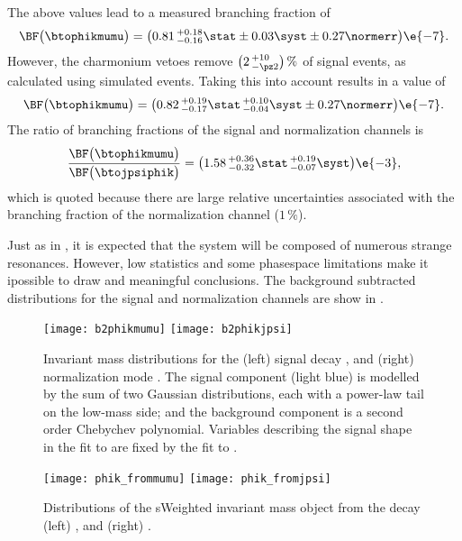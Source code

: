 The above values lead to a measured branching fraction of
\begin{equation}
  \BF\big(\btophikmumu\big)=
  \big(0.81\,^{+0.18}_{-0.16}\stat\pm0.03\syst\pm0.27\normerr\big)\e{-7}.
\end{equation}
However, the charmonium vetoes remove $\big(2\,^{+10}_{-\pz2}\big)\,\%$ of signal events, as
calculated using simulated events.
Taking this into account results in a value of
\begin{equation}
  \BF\big(\btophikmumu\big)=
  \big(0.82\,^{+0.19}_{-0.17}\stat\,^{+0.10}_{-0.04}\syst\pm0.27\normerr\big)\e{-7}.
\end{equation}
The ratio of branching fractions of the signal and normalization channels is
\begin{equation}
  \frac{ \BF\big(\btophikmumu\big) }{ \BF\big(\btojpsiphik\big) }
  =\big(1.58\,^{+0.36}_{-0.32}\stat\,^{+0.19}_{-0.07}\syst\big)\e{-3},
\end{equation}
which is quoted because there are large relative uncertainties associated with the branching
fraction of the normalization channel (\approx$1\,\%$).

Just as in \kpipi, it is expected that the \phik system will be composed of numerous strange
resonances.
However, low statistics and some phasespace limitations make it ipossible to draw and meaningful
conclusions.
The background subtracted \phik distributions for the signal and normalization channels are show in
.


\begin{figure}
  \begin{center}
    \texttt{[image: b2phikmumu]}
    \texttt{[image: b2phikjpsi]}
    \caption[Fits to \btokphimumu and \btojpsiphik]
    {
      Invariant mass distributions for the
      (left) signal decay \btophikmumu, and
      (right) normalization mode \btojpsiphik.
      The signal component (light blue) is modelled by the sum of two Gaussian distributions, each
      with a power-law tail on the low-mass side; and the background component is a second order
      Chebychev polynomial.
      Variables describing the signal shape in the fit to \btophikmumu are fixed by the fit to
      \btojpsiphik.
    }
    \label{fig:phik:fit}
  \end{center}
\end{figure}


\begin{figure}
  \begin{center}
    \texttt{[image: phik\_frommumu]}
    \texttt{[image: phik\_fromjpsi]}
    \caption[Invariant mass distributions of \phik]
    {
      Distributions of the sWeighted invariant mass \phik object from the decay
      (left) \btophikmumu, and
      (right) \btojpsiphik.
    }
    \label{fig:phik:phik}
  \end{center}
\end{figure}




